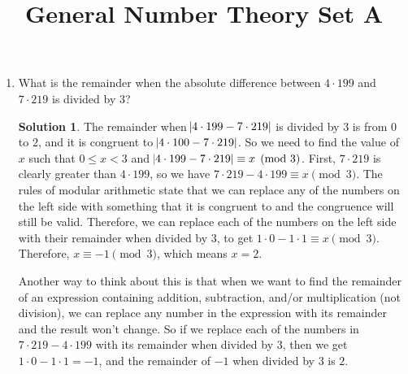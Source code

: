 \documentclass{article}
\title{General Number Theory Set A}
\date{}
\author{}
\theoremstyle{definition}
\newtheorem*{solution}{Solution}
\begin{document}
\maketitle

\begin{multicols}{2}
    \begin{enumerate}
        \item What is the remainder when the absolute difference between $4 \cdot 199$ and $7 \cdot 219$ is divided by $3$?
            \begin{solution}
                The remainder when $\abs{4 \cdot 199 - 7 \cdot 219}$ is divided by $3$ is from $0$ to $2$, and it is congruent to $\abs{4 \cdot 100 - 7 \cdot 219}$.
                So we need to find the value of $x$ such that $0 \leq x < 3$ and $\abs{4 \cdot 199 - 7 \cdot 219} \equiv x \pmod{3}$.
                First, $7 \cdot 219$ is clearly greater than $4 \cdot 199$, so we have $7 \cdot 219 - 4 \cdot 199 \equiv x \pmod{3}$.
                The rules of modular arithmetic state that we can replace any of the numbers on the left side with something that it is congruent to and the congruence will still be valid.
                Therefore, we can replace each of the numbers on the left side with their remainder when divided by $3$, to get $1 \cdot 0 - 1 \cdot 1 \equiv x \pmod{3}$.
                Therefore, $x \equiv -1 \pmod{3}$, which means $x = 2$.

                Another way to think about this is that when we want to find the remainder of an expression containing addition, subtraction, and/or multiplication (not division), we can replace any number in the expression with its remainder and the result won't change.
                So if we replace each of the numbers in $7 \cdot 219 - 4 \cdot 199$ with its remainder when divided by $3$, then we get $1 \cdot 0 - 1 \cdot 1 = -1$, and the remainder of $-1$ when divided by $3$ is $\boxed{2}$.


\end{solution}
\end{enumerate}
\end{multicols}
\end{document}
